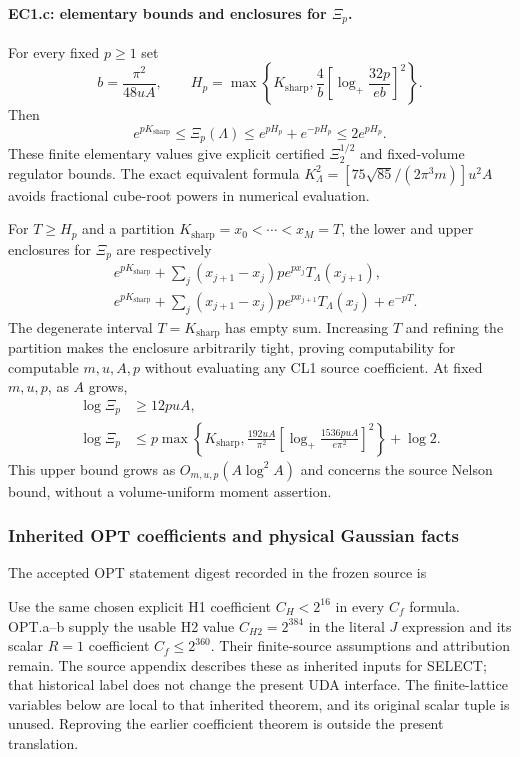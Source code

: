 \paragraph{EC1.c: elementary bounds and enclosures for $\Xi_p$.}
For every fixed $p\ge1$ set
\[
 b=\frac{\pi^2}{48uA},\qquad
 H_p=\max\left\{K_{\mathrm{sharp}},\frac4b
                      \left[\log_+\frac{32p}{eb}\right]^2\right\}.
\]
Then
\[
 e^{pK_{\mathrm{sharp}}}\le\Xi_p(\Lambda)
 \le e^{pH_p}+e^{-pH_p}\le2e^{pH_p}.
\]
These finite elementary values give explicit certified
$\Xi_2^{1/2}$ and fixed-volume regulator bounds. The exact equivalent
formula $K_\Lambda^2=[75\sqrt{85}/(2\pi^3m)]u^2A$ avoids fractional
cube-root powers in numerical evaluation.

For $T\ge H_p$ and a partition $K_{\mathrm{sharp}}=x_0<\cdots<x_M=T$,
the lower and upper enclosures for $\Xi_p$ are respectively
\begin{align*}
 &e^{pK_{\mathrm{sharp}}}
   +\sum_j(x_{j+1}-x_j)pe^{px_j}T_\Lambda(x_{j+1}),\\
 &e^{pK_{\mathrm{sharp}}}
   +\sum_j(x_{j+1}-x_j)pe^{px_{j+1}}T_\Lambda(x_j)+e^{-pT}.
\end{align*}
The degenerate interval $T=K_{\mathrm{sharp}}$ has empty sum.
Increasing $T$ and refining the partition makes the enclosure arbitrarily
tight, proving computability for computable $m,u,A,p$ without evaluating
any CL1 source coefficient. At fixed $m,u,p$, as $A$ grows,
\begin{align*}
 \log\Xi_p&\ge12puA,\\
 \log\Xi_p&\le p\max\left\{K_{\mathrm{sharp}},\frac{192uA}{\pi^2}
           \left[\log_+\frac{1536puA}{e\pi^2}\right]^2\right\}+\log2.
\end{align*}
This upper bound grows as $O_{m,u,p}(A\log^2A)$ and concerns the source
Nelson bound, without a volume-uniform moment assertion.

\subsubsection{Inherited OPT coefficients and physical Gaussian facts}
The accepted OPT statement digest recorded in the frozen source is
\par{}\par
Use the same chosen explicit H1 coefficient $C_H<2^{16}$ in every
$C_f$ formula. OPT.a--b supply the usable H2 value $C_{H2}=2^{384}$
in the literal $J$ expression and its scalar $R=1$ coefficient
$C_f\le2^{360}$. Their finite-source assumptions and attribution remain.
The source appendix describes these as inherited inputs for SELECT;
that historical label does not change the present UDA interface. The
finite-lattice variables below are local to that inherited theorem,
and its original scalar tuple is unused. Reproving the earlier coefficient
theorem is outside the present translation.

